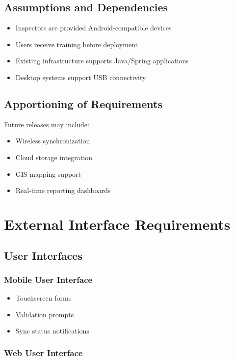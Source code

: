 \documentclass[12pt]{article}
\begin{document}
\subsection{Assumptions and Dependencies}

\begin{itemize}
\item Inspectors are provided Android-compatible devices
\item Users receive training before deployment
\item Existing infrastructure supports Java/Spring applications
\item Desktop systems support USB connectivity
\end{itemize}

\subsection{Apportioning of Requirements}

Future releases may include:

\begin{itemize}
\item Wireless synchronization
\item Cloud storage integration
\item GIS mapping support
\item Real-time reporting dashboards
\end{itemize}

\section{External Interface Requirements}

\subsection{User Interfaces}

\subsubsection*{Mobile User Interface}

\begin{itemize}
\item Touchscreen forms
\item Validation prompts
\item Sync status notifications
\end{itemize}

\subsubsection*{Web User Interface}
\end{document}
